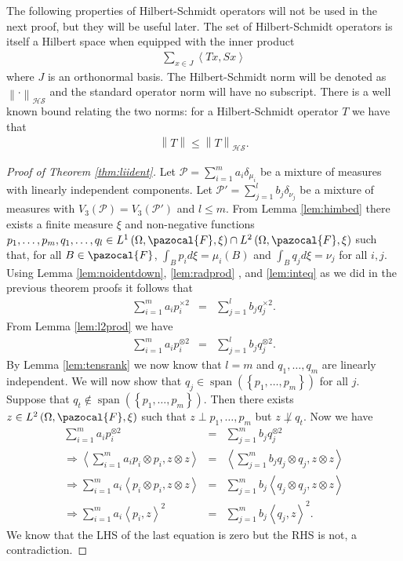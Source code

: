 \documentclass[aos,preprint]{imsart}
\def\l{\left}
\def\r{\right}
\def\sF{\pazocal{F}}
\def\sP{\mathscr{P}}
\def\hs{\mathscr{HS}}
\def\spn{\operatorname{span}}
\theoremstyle{plain}
\theoremstyle{defintion}
\begin{document}
	The following properties of Hilbert-Schmidt operators will not be used in the next proof, but they will be useful later. The set of Hilbert-Schmidt operators is itself a Hilbert space when equipped with the inner product
	\begin{eqnarray*}
		\sum_{x\in J} \l<Tx,Sx\r>
	\end{eqnarray*}
	where $J$ is an orthonormal basis. The Hilbert-Schmidt norm will be denoted as $\l\|\cdot \r\|_\hs$ and the standard operator norm will have no subscript. There is a well known bound relating the two norms: for a Hilbert-Schmidt operator $T$ we have that 
	\begin{eqnarray*}
		\l\|T \r\| \le \l\|T \r\|_\hs.
	\end{eqnarray*}

	\begin{proof}[Proof of Theorem \ref{thm:liident}]
		Let $\sP = \sum_{i=1}^m a_i \delta_{\mu_i}$ be a mixture of measures with linearly independent components. Let $\sP' = \sum_{j=1}^l  b_j \delta_{\nu_j}$ be a mixture of measures with $V_3(\sP) = V_3(\sP')$ and $l\le m$. From Lemma \ref{lem:himbed} there exists a finite measure $\xi$ and non-negative functions $p_1,\ldots,p_m,q_1,\ldots,q_l \in L^1\left( \Omega, \sF, \xi \right)\cap L^2\left( \Omega, \sF, \xi \right)$ such that, for all $B\in \sF$, $\int_B p_i d\xi = \mu_i(B)$ and $\int_B q_j d\xi = \nu_j$ for all $i,j$. Using Lemma \ref{lem:noidentdown}, \ref{lem:radprod} , and \ref{lem:inteq} as we did in the previous theorem proofs it follows that
		\begin{eqnarray*}
			\sum_{i=1}^m a_i p_i^{\times 2}   &=& \sum_{j=1}^l b_j q_j^{\times 2}.
		\end{eqnarray*}
		From Lemma \ref{lem:l2prod} we have
		\begin{eqnarray*}
			\sum_{i=1}^m a_i p_i^{\otimes 2}   &=& \sum_{j=1}^l b_j q_j^{\otimes 2}.
		\end{eqnarray*}
		By Lemma \ref{lem:tensrank} we now know that $l=m$ and $q_1,\ldots,q_m$ are linearly independent.
		We will now show that $q_j\in \spn\left( \l\{p_1,\ldots,p_m \r\}\right)$ for all $j$. Suppose that $q_t \notin \spn\left(\l\{ p_1,\ldots,p_m \r\}\right)$. Then there exists $z\in L^2\left( \Omega,\sF,\xi \right)$ such that $z\perp p_1,\ldots ,p_m$ but $z \not \perp q_t$. Now we have 
		\begin{eqnarray*}
			\sum_{i=1}^m a_i p_i^{\otimes 2}   &=& \sum_{j=1}^m b_j q_j^{\otimes 2}\\
			\Rightarrow \l<\sum_{i=1}^m a_i p_i\otimes p_i, z\otimes z\r>   &=& \l<\sum_{j=1}^m b_j q_j \otimes q_j,z\otimes z\r> \\
			\Rightarrow \sum_{i=1}^m a_i \l< p_i \otimes p_i, z\otimes z\r>   &=& \sum_{j=1}^m b_j \l<  q_j\otimes q_j,z\otimes z\r> \\
			\Rightarrow \sum_{i=1}^m a_i \l< p_i , z\r>^2   &=& \sum_{j=1}^m b_j \l<  q_j,z\r>^2.
		\end{eqnarray*}
		We know that the LHS of the last equation is zero but the RHS is not, a contradiction.


\end{proof}
\end{document}
